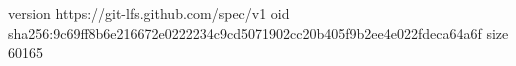 version https://git-lfs.github.com/spec/v1
oid sha256:9c69ff8b6e216672e0222234c9cd5071902cc20b405f9b2ee4e022fdeca64a6f
size 60165

